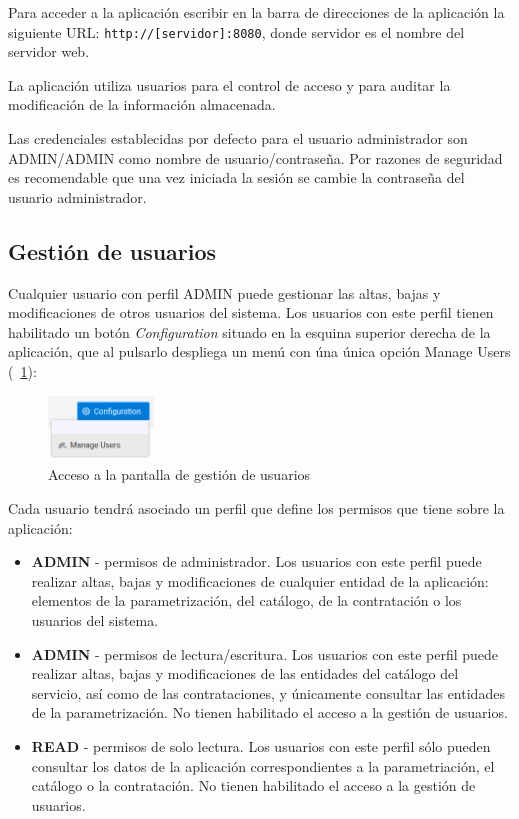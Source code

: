 Para acceder a la aplicación escribir en la barra de direcciones de la aplicación la
siguiente URL: {\footnotesize \tt http://[servidor]:8080}, donde servidor es el nombre del servidor web.

La aplicación utiliza usuarios para el control de acceso y para auditar la
modificación de la información almacenada.

Las credenciales establecidas por defecto para el usuario administrador son ADMIN/ADMIN como nombre de usuario/contraseña. Por razones de seguridad es recomendable que una vez iniciada la sesión se cambie la contraseña del usuario administrador.
 
 
 
\subsection{Gestión de usuarios}
\label{sub:gestion-usuarios}

Cualquier usuario con perfil ADMIN puede gestionar las altas, bajas y modificaciones de otros usuarios del sistema. Los usuarios con este perfil tienen habilitado un botón \emph{Configuration} situado en la esquina superior derecha de la aplicación, que al pulsarlo despliega un menú con úna única opción Manage Users (\figurename~\ref{fig:boton-gestion-usuarios}):

\begin{figure}[H]
  \centering
  \includegraphics[width=0.25\textwidth]{imaxes/gestion-usuarios-01.png}
  \caption{Acceso a la pantalla de gestión de usuarios}
  \label{fig:boton-gestion-usuarios}
\end{figure}


Cada usuario tendrá asociado un perfil que define los permisos que tiene sobre la aplicación:
\begin{itemize}
\item \textbf{ADMIN} - permisos de administrador. Los usuarios con este perfil puede realizar altas, bajas y modificaciones de cualquier entidad de la aplicación: elementos de la parametrización, del catálogo, de la contratación o los usuarios del sistema.
\item \textbf{ADMIN} - permisos de lectura/escritura. Los usuarios con este perfil puede realizar altas, bajas y modificaciones de las entidades del catálogo del servicio, así como de las contrataciones, y únicamente consultar las entidades de la parametrización. No tienen habilitado el acceso a la gestión de usuarios.
\item \textbf{READ} - permisos de solo lectura. Los usuarios con este perfil sólo pueden consultar los datos de la aplicación correspondientes a la parametriación, el catálogo o la contratación. No tienen habilitado el acceso a la gestión de usuarios.
\end{itemize}


